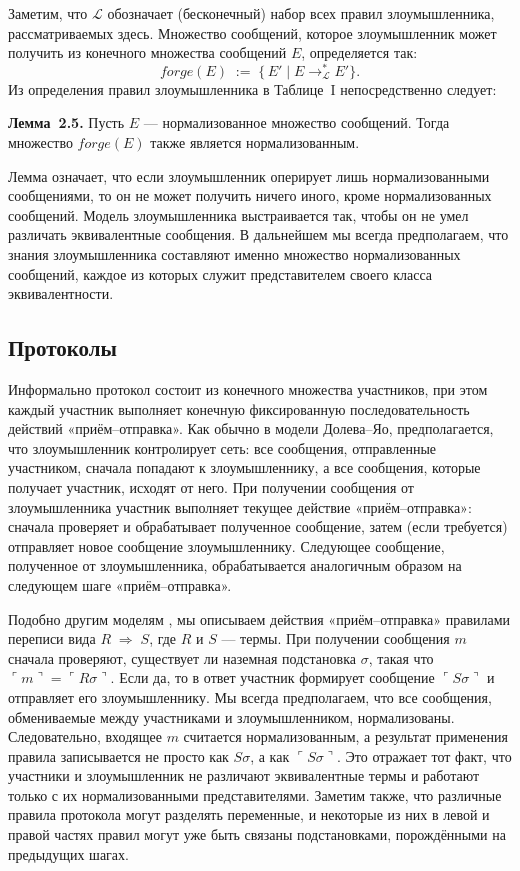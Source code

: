 Заметим, что $\mathcal{L}$ обозначает (бесконечный) набор всех правил злоумышленника, рассматриваемых здесь. Множество сообщений, которое злоумышленник может получить из конечного множества сообщений $E$, определяется так:
\[
\mathit{forge}(E)\;:=\;\{\,E' \mid E \to_{\mathcal{L}}^{*} E'\}.
\]
Из определения правил злоумышленника в Таблице I непосредственно следует: 

\medskip
\noindent\textbf{Лемма 2.5.} Пусть \(E\) — нормализованное множество сообщений. Тогда множество \(\mathit{forge}(E)\) также является нормализованным.

Лемма означает, что если злоумышленник оперирует лишь нормализованными сообщениями, 
то он не может получить ничего иного, кроме нормализованных сообщений. Модель 
злоумышленника выстраивается так, чтобы он не умел различать эквивалентные сообщения. 
В дальнейшем мы всегда предполагаем, что знания злоумышленника составляют именно 
множество нормализованных сообщений, каждое из которых служит представителем своего 
класса эквивалентности.

\subsection{Протоколы}

Информально протокол состоит из конечного множества участников, при этом каждый участник выполняет конечную фиксированную последовательность действий «приём–отправка». Как обычно в модели Долева–Яо, предполагается, что злоумышленник контролирует сеть: все сообщения, отправленные участником, сначала попадают к злоумышленнику, а все сообщения, которые получает участник, исходят от него. При получении сообщения от злоумышленника участник выполняет текущее действие «приём–отправка»: сначала проверяет и обрабатывает полученное сообщение, затем (если требуется) отправляет новое сообщение злоумышленнику. Следующее сообщение, полученное от злоумышленника, обрабатывается аналогичным образом на следующем шаге «приём–отправка».

Подобно другим моделям \cite{RusinowitchTuruani2001}, мы описываем действия «приём–отправка» правилами переписи вида $R \;\Rightarrow\; S$, где $R$ и $S$ — термы. При получении сообщения $m$ сначала проверяют, существует ли наземная подстановка $\sigma$, такая что $\ulcorner m \urcorner = \ulcorner R\sigma \urcorner$. Если да, то в ответ участник формирует сообщение $\ulcorner S\sigma \urcorner$ и отправляет его злоумышленнику. Мы всегда предполагаем, что все сообщения, обмениваемые между участниками и злоумышленником, нормализованы. Следовательно, входящее $m$ считается нормализованным, а результат применения правила записывается не просто как $S\sigma$, а как $\ulcorner S\sigma\urcorner$. Это отражает тот факт, что участники и злоумышленник не различают эквивалентные термы и работают только с их нормализованными представителями. Заметим также, что различные правила протокола могут разделять переменные, и некоторые из них в левой и правой частях правил могут уже быть связаны подстановками, порождёнными на предыдущих шагах.

